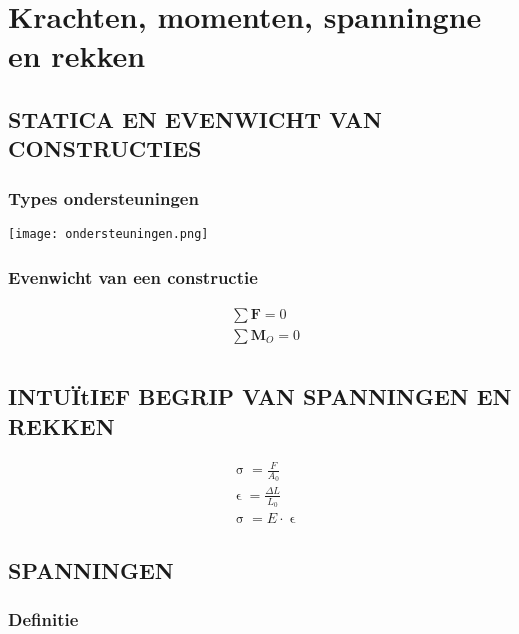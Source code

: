 \chapter{Krachten, momenten, spanningne en rekken}

    \section{STATICA EN EVENWICHT VAN CONSTRUCTIES}

        \subsection{Types ondersteuningen}

            \texttt{[image: ondersteuningen.png]}

        \subsection{Evenwicht van een constructie}

            \begin{align*}
                &\sum\mathbf{F} = 0\\
                &\sum\mathbf{M}_O = 0\\
            \end{align*}
    
    \section{INTUÏtIEF BEGRIP VAN SPANNINGEN EN REKKEN}

        \begin{align*}
            &\upsigma = \frac{F}{A_0}\\
            &\upvarepsilon = \frac{\Delta L}{L_0}\\
            &\upsigma = E\cdot \upvarepsilon
        \end{align*}

    \section{SPANNINGEN}
        
        \subsection{Definitie}

